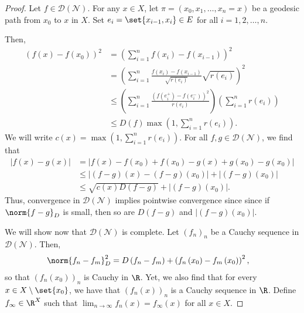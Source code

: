 \documentclass[10pt]{mypackage}
\begin{document}
\begin{proof}
  Let $f\in \mathcal{D}\left( \mathcal{N} \right)$. For any $x\in X$, let $\pi = \left( x_0,x_1,\dots,x_n = x \right)$ be a geodesic path from $x_0$ to $x$ in $X$. Set $e_i = \set{x_{i-1},x_i}\in E$ for all $i=1,2,\dots,n$.

  Then,
  \begin{align*}
    \left( f\left( x \right) - f\left( x_0 \right) \right)^2 &= \left( \sum_{i=1}^{n} f\left( x_i \right)-f\left( x_{i-1} \right) \right)^2\\
                                                             &= \left( \sum_{i=1}^{n}\frac{f\left( x_i \right)-f\left( x_{i-1} \right)}{\sqrt{r\left( e_i \right)}}\sqrt{r\left( e_i \right)} \right)^2\\
                                                             &\leq \left( \sum_{i=1}^{n}\frac{\left( f\left( e_i^{+} \right)-f\left( e_i^{-} \right) \right)^2}{r\left( e_i \right)} \right) \left( \sum_{i=1}^{n}r\left( e_i \right) \right)\\
                                                             &\leq D(f)\max\left( 1,\sum_{i=1}^{n}r\left( e_i \right) \right).
  \end{align*}
  We will write $c(x) = \max\left( 1,\sum_{i=1}^{n}r\left( e_i \right) \right)$. For all $f,g\in \mathcal{D}\left( \mathcal{N} \right)$, we find that
  \begin{align*}
    \left\vert f(x)-g(x) \right\vert &= \left\vert f\left( x \right)-f\left( x_0 \right) + f\left( x_0 \right)-g\left( x \right) + g\left( x_0 \right) - g\left( x_0 \right) \right\vert\\
                                     &\leq \left\vert \left( f-g \right)(x)-\left( f-g \right)\left( x_0 \right) \right\vert + \left\vert \left( f-g \right)\left( x_0 \right) \right\vert\\
                                     &\leq \sqrt{c(x)D\left( f-g \right)} + \left\vert \left( f-g \right)\left( x_0 \right) \right\vert.
  \end{align*}
  Thus, convergence in $\mathcal{D}\left( \mathcal{N} \right)$ implies pointwise convergence since since if $\norm{f-g}_D$ is small, then so are $D\left( f-g \right)$ and $\left\vert \left( f-g \right)\left( x_0 \right) \right\vert$.

  We will show now that $\mathcal{D}\left( \mathcal{N} \right)$ is complete. Let $\left( f_n \right)_{n}$ be a Cauchy sequence in $ \mathcal{D}\left( \mathcal{N} \right) $. Then,
  \begin{align*}
    \norm{f_n - f_m}_{D}^2 &= D\left( f_n-f_m \right) + \left( f_n\left( x_0 \right)-f_m\left( x_0 \right) \right)^2,
  \end{align*}
  so that $\left( f_n\left( x_0 \right) \right)_{n}$ is Cauchy in $\R$. Yet, we also find that for every $x\in X\setminus \set{x_0}$, we have that $\left( f_n(x) \right)_{n}$ is a Cauchy sequence in $\R$. Define $f_{\infty}\in \R^X$ such that $\lim_{n\to\infty}f_n(x) = f_{\infty}(x)$ for all $x\in X$.


\end{proof}
\end{document}
